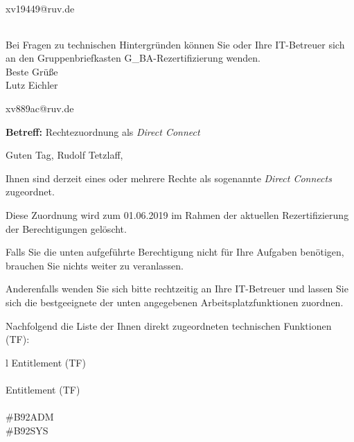 \documentclass[a4paper,landscape,12pt]{letter}
\begin{document}
\begin{letter}{xv19449@ruv.de\hfill \break}
\begin{tiny}
\begin{longtable}{|p{35mm}|p{15mm}|p{25mm}|p{10mm}|p{40mm}|p{50mm}|p{50mm}|}
\hline
		\end{longtable}
		\end{tiny}
	
\begin{minipage}{\textwidth}
			Bei Fragen zu technischen Hintergründen können Sie 
			oder Ihre IT-Betreuer sich an den Gruppenbriefkasten 
			G\_BA-Rezertifizierung
			wenden.\\
			\linebreak
			Beste Grüße\\
			Lutz Eichler
	\end{minipage}
	\end{letter}
	
\begin{letter}{xv889ac@ruv.de\hfill \break}
\begin{normalsize}
	\opening{\textbf{Betreff:} Rechtezuordnung als \emph{Direct Connect}}
	\begin{normalsize} \hfill
	\end{normalsize}

	\begin{normalsize}
		Guten Tag, 
	Rudolf Tetzlaff, \hfill \break
	\end{normalsize}
	\end{normalsize}
	
\begin{normalsize}
	Ihnen sind derzeit eines oder mehrere Rechte als sogenannte \emph{Direct Connects} zugeordnet.
	
	Diese Zuordnung wird zum 01.06.2019 im Rahmen der aktuellen Rezertifizierung der Berechtigungen gelöscht.
	
	Falls Sie die unten aufgeführte Berechtigung nicht für Ihre Aufgaben benötigen, 
	brauchen Sie nichts weiter zu veranlassen.
	
	Anderenfalls wenden Sie sich bitte rechtzeitig an Ihre IT-Betreuer 
	und lassen Sie sich die bestgeeignete der unten angegebenen Arbeitsplatzfunktionen zuordnen.
	\end{normalsize}
	
\begin{normalsize}
	Nachfolgend die Liste der Ihnen direkt zugeordneten technischen Funktionen (TF):

	\begin{longtable}{l}
		Entitlement (TF) \\ \hline
		\endfirsthead
		\\\hline
		Entitlement (TF) \\ \hline
		\endhead %
		\multicolumn{1}{r@{}}{Fortsetzung \ldots}\\
		\endfoot
		\hline
		\endlastfoot
	\#B92ADM\\\#B92SYS\\
	\end{longtable}
	\end{normalsize}
	

\end{letter}
\end{document}

